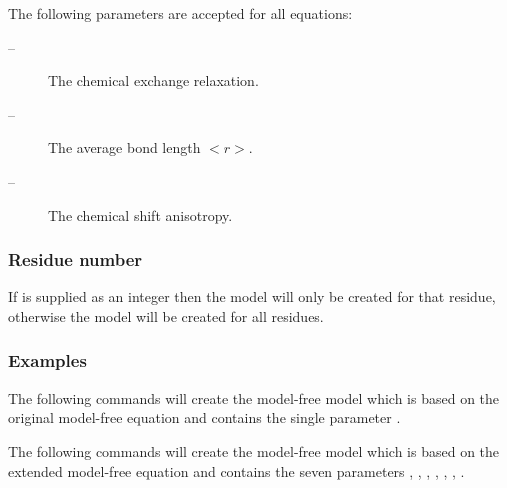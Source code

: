  The following parameters are accepted for all equations: 
  

 \begin{description} 
 \item[ --]  The chemical exchange relaxation.  
 \item[ --]    The average bond length $<$$r$$>$.  
 \item[ --]  The chemical shift anisotropy.  
 \end{description} 
  

  
 \subsubsection{Residue number} 

 If  is supplied as an integer then the model will only be created for that residue, otherwise the model will be created for all residues. 
  

  
 \subsubsection{Examples} 

 The following commands will create the model-free model  which is based on the original model-free equation and contains the single parameter . 
  



 The following commands will create the model-free model  which is based on the extended model-free equation and contains the seven parameters , , , , , , . 
  



  

 \newpage 

